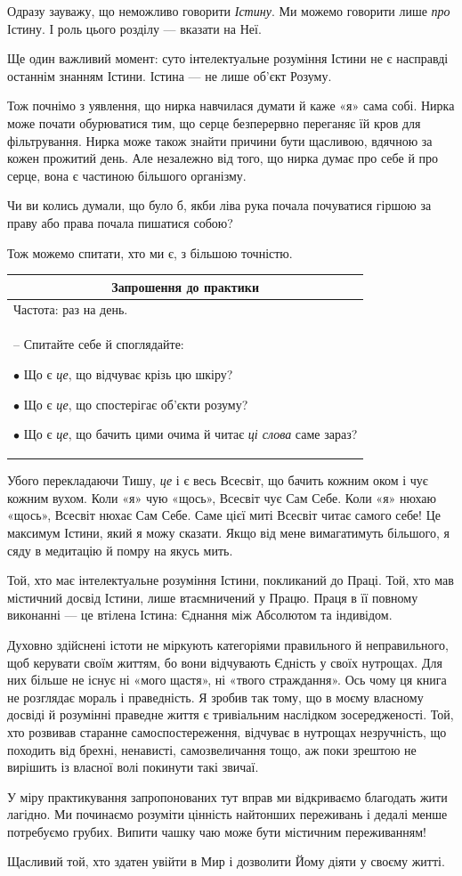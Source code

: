 \documentclass[oneside, 12pt]{book}
\newenvironment{prat}[1]
{\begin{center}
\begin{tabular}{p{0.9\textwidth}}
\hline\hline
\multicolumn{1}{c}{Запрошення до практики}\\
\hline
Частота: #1.\\
\hline
}{\\
\hline\hline
\end{tabular} 
\end{center}}
\begin{document}
Одразу зауважу, що неможливо говорити \textit{Істину}. Ми можемо говорити лише \textit{про} Істину. І роль цього розділу --- вказати на Неї.

Ще один важливий момент: суто інтелектуальне розуміння Істини не є насправді останнім знанням Істини. Істина --- не лише об'єкт Розуму.

Тож почнімо з уявлення, що нирка навчилася думати й каже «я» сама собі. Нирка може почати обурюватися тим, що серце безперервно переганяє їй кров для фільтрування. Нирка може також знайти причини бути щасливою, вдячною за кожен прожитий день. Але незалежно від того, що нирка думає про себе й про серце, вона є частиною більшого організму.

Чи ви колись думали, що було б, якби ліва рука почала почуватися гіршою за праву або права почала пишатися собою?

Тож можемо спитати, хто ми є, з більшою точністю.

\begin{prat}{раз на день}

-- Спитайте себе й споглядайте:

$\bullet$ Що є \textit{це}, що відчуває крізь цю шкіру?

$\bullet$ Що є \textit{це}, що спостерігає об'єкти розуму?

$\bullet$ Що є \textit{це}, що бачить цими очима й читає \textit{ці слова} саме зараз?
\end{prat}

Убого перекладаючи Тишу, \textit{це} і є весь Всесвіт, що бачить кожним оком і чує кожним вухом. Коли «я» чую «щось», Всесвіт чує Сам Себе. Коли «я» нюхаю «щось», Всесвіт нюхає Сам Себе. Саме цієї миті Всесвіт читає самого себе! Це максимум Істини, який я можу сказати. Якщо від мене вимагатимуть більшого, я сяду в медитацію й помру на якусь мить.

Той, хто має інтелектуальне розуміння Істини, покликаний до Праці. Той, хто мав містичний досвід Істини, лише втаємничений у Працю. Праця в її повному виконанні --- це втілена Істина: Єднання між Абсолютом та індивідом.

Духовно здійснені істоти не міркують категоріями правильного й неправильного, щоб керувати своїм життям, бо вони відчувають Єдність у своїх нутрощах. Для них більше не існує ні «мого щастя», ні «твого страждання». Ось чому ця книга не розглядає мораль і праведність. Я зробив так тому, що в моєму власному досвіді й розумінні праведне життя є тривіальним наслідком зосередженості. Той, хто розвивав старанне самоспостереження, відчуває в нутрощах незручність, що походить від брехні, ненависті, самозвеличання тощо, аж поки зрештою не вирішить із власної волі покинути такі звичаї.

У міру практикування запропонованих тут вправ ми відкриваємо благодать жити лагідно. Ми починаємо розуміти цінність найтонших переживань і дедалі менше потребуємо грубих. Випити чашку чаю може бути містичним переживанням!

Щасливий той, хто здатен увійти в Мир і дозволити Йому діяти у своєму житті.
\end{document}
